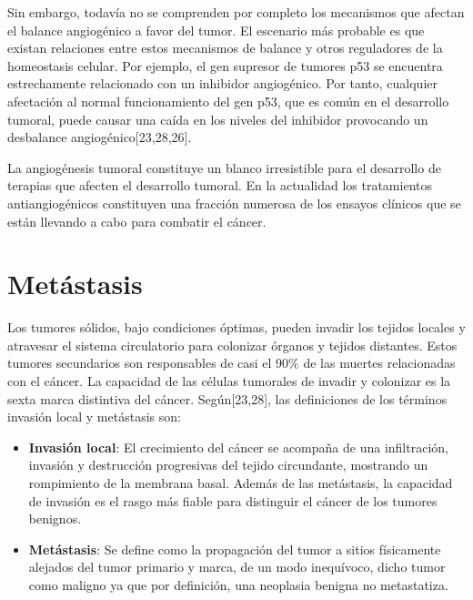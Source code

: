 Sin embargo, todavía no se comprenden por completo los mecanismos que afectan el balance angiogénico a favor del tumor. El escenario más probable es que existan relaciones entre estos mecanismos de balance y otros reguladores de la homeostasis celular. Por ejemplo, el gen supresor de tumores p53 se encuentra estrechamente relacionado con un inhibidor angiogénico. Por tanto, cualquier afectación al normal funcionamiento del gen p53, que es común en el desarrollo tumoral, puede causar una caída en los niveles del inhibidor provocando un desbalance angiogénico[23,28,26].

\hspace{.1cm}La angiogénesis tumoral constituye un blanco irresistible para el desarrollo de terapias que afecten el desarrollo tumoral. En la actualidad los tratamientos antiangiogénicos constituyen una fracción numerosa de los ensayos clínicos que se están llevando a cabo para combatir el cáncer.

\section{Metástasis}
\hspace{.1cm}Los tumores sólidos, bajo condiciones óptimas, pueden invadir los tejidos locales y atravesar el sistema circulatorio para colonizar órganos y tejidos distantes. Estos tumores secundarios son responsables de casi el 90\% de las muertes relacionadas con el cáncer. La capacidad de las células tumorales de invadir y colonizar es la sexta marca distintiva del cáncer. Según[23,28], las definiciones de los términos invasión local y metástasis son:
\begin{itemize}
    \item \textbf{Invasión local}: El crecimiento del cáncer se acompaña de una infiltración, invasión y destrucción progresivas del tejido circundante, mostrando un rompimiento de la membrana basal. Además de las metástasis, la capacidad de invasión es el rasgo más fiable para distinguir el cáncer de los tumores benignos.
    \item \textbf{Metástasis}: Se define como la propagación del tumor a sitios físicamente alejados del tumor primario y marca, de un modo inequívoco, dicho tumor como maligno ya que por definición, una neoplasia benigna no metastatiza.
\end{itemize}


